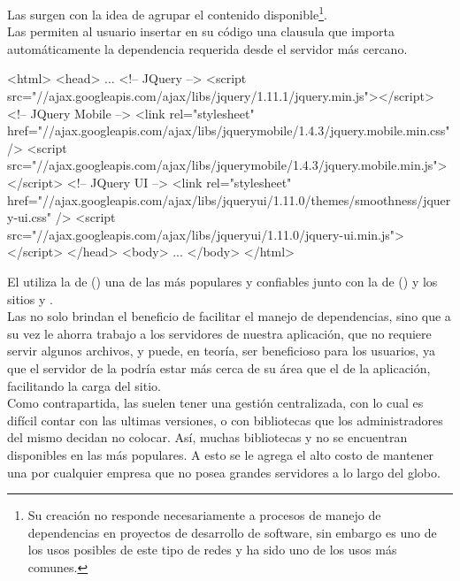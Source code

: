 Las \cdn surgen con la idea de agrupar el contenido disponible\footnote{
	Su creación no responde necesariamente a procesos de manejo de dependencias
	en proyectos de desarrollo de software, sin embargo es uno de los usos
	posibles de este tipo de redes y ha sido uno de los usos más comunes.
}.\\
Las \cdn permiten al usuario insertar en su código \html una clausula que
importa automáticamente la dependencia requerida desde el servidor más cercano.
\\
\begin{htmlcode}[caption=Dependencias agregadas mediante \cdn,
	label=code:intro:cdn:cdn_deps]
<html>
	<head>
		...
		<!-- JQuery -->
		<script src="//ajax.googleapis.com/ajax/libs/jquery/1.11.1/jquery.min.js"></script>
		<!-- JQuery Mobile -->
		<link rel="stylesheet" href="//ajax.googleapis.com/ajax/libs/jquerymobile/1.4.3/jquery.mobile.min.css" />
		<script src="//ajax.googleapis.com/ajax/libs/jquerymobile/1.4.3/jquery.mobile.min.js"></script>
		<!-- JQuery UI -->
		<link rel="stylesheet" href="//ajax.googleapis.com/ajax/libs/jqueryui/1.11.0/themes/smoothness/jquery-ui.css" />
		<script src="//ajax.googleapis.com/ajax/libs/jqueryui/1.11.0/jquery-ui.min.js"></script>
	</head>
	<body>
		...
	</body>
</html>
\end{htmlcode}

El  utiliza la \cdn de \citeauthor{GoogleCDN:ONLINE}
() una de las más populares y confiables junto con la de
\citeauthor{MicrosoftCDN:ONLINE} () y los sitios
 y .\\
Las \cdns no solo brindan el beneficio de facilitar el manejo de dependencias,
sino que a su vez le ahorra trabajo a los servidores de nuestra aplicación, que no
requiere servir algunos archivos, y puede, en teoría, ser beneficioso
para los usuarios, ya que el servidor de la \cdn podría estar más cerca de su área que
el de la aplicación, facilitando la carga del sitio.\\
Como contrapartida, las \cdns suelen tener una gestión centralizada, con lo cual es
difícil contar con las ultimas versiones, o con bibliotecas que los administradores
del mismo decidan no colocar. Así, muchas bibliotecas y \frameworks no se encuentran
disponibles en las \cdns más populares. A esto se le agrega el alto costo de mantener
una \cdn por cualquier empresa que no posea grandes servidores a lo largo del globo.

